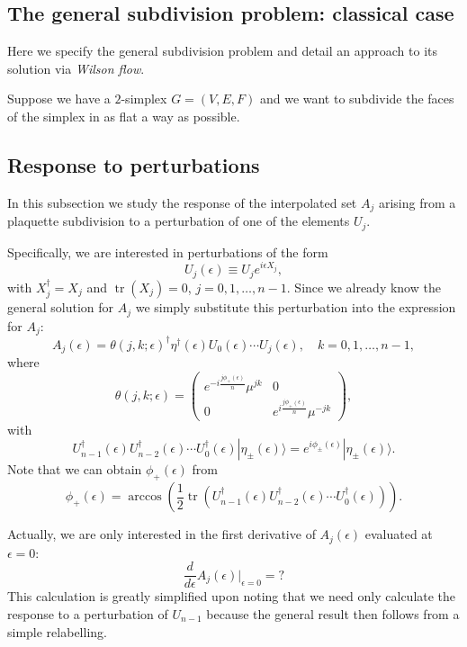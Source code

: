 \documentclass[12pt]{amsart}
\newcommand{\tr}{\operatorname{tr}}
\theoremstyle{definition}
\theoremstyle{remark}
\numberwithin{equation}{section}
\begin{document}
\subsection{The general subdivision problem: classical case}
Here we specify the general subdivision problem and detail an approach to its solution via \emph{Wilson flow}. 

Suppose we have a $2$-simplex $G = (V,E,F)$ and we want to subdivide the faces of the simplex in as flat a way as possible. 

\subsection{Response to perturbations}
In this subsection we study the response of the interpolated set $A_j$ arising from a plaquette subdivision to a perturbation of one of the elements $U_j$.

Specifically, we are interested in perturbations of the form
\begin{equation}
	U_j(\epsilon) \equiv U_j e^{i\epsilon X_j},
\end{equation}
with $X^\dag_j = X_j$ and $\tr(X_j) = 0$, $j = 0, 1, \ldots, n-1$. Since we already know the general solution for $A_j$ we simply substitute this perturbation into the expression for $A_j$:
\begin{equation}
	A_j(\epsilon) = \theta(j,k; \epsilon)^\dag \eta^\dag(\epsilon) U_0(\epsilon) \cdots U_{j}(\epsilon), \quad k = 0, 1, \ldots, n-1,
\end{equation}
where 
\begin{equation}	
	\theta(j,k; \epsilon) = \begin{pmatrix} e^{-i\frac{j\phi_{+}(\epsilon)}{n}}\mu^{jk} & 0 \\ 0 &  e^{i\frac{j\phi_{+}(\epsilon)}{n}}\mu^{-jk}\end{pmatrix},
\end{equation}
with 
\begin{equation}
	U_{n-1}^\dag(\epsilon) U_{n-2}^\dag(\epsilon) \cdots U_0^\dag(\epsilon) |\eta_{\pm}(\epsilon)\rangle = e^{i\phi_{\pm}(\epsilon)}|\eta_{\pm}(\epsilon)\rangle.
\end{equation}
Note that we can obtain $\phi_+(\epsilon)$ from
\begin{equation}
	\phi_+(\epsilon) = \arccos\left(\frac12 \tr(U_{n-1}^\dag(\epsilon) U_{n-2}^\dag(\epsilon) \cdots U_0^\dag(\epsilon))\right).
\end{equation}

Actually, we are only interested in the first derivative of $A_j(\epsilon)$ evaluated at $\epsilon = 0$:
\begin{equation}
	\frac{d}{d\epsilon} A_j(\epsilon) \bigg|_{\epsilon = 0} = ?
\end{equation}
This calculation is greatly simplified upon noting that we need only calculate the response to a perturbation of $U_{n-1}$ because the general result then follows from a simple relabelling.
\end{document}
